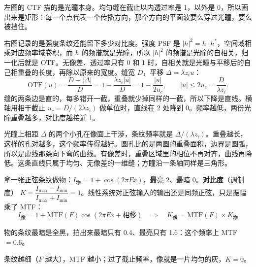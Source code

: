 左图的 CTF 描的是光瞳本身。均匀缝在截止以内透过率是 1，以外是 0，所以画出来是矩形：每一个点代表一个传播方向，那个方向的平面波要么穿过光瞳，要么被挡住。

右图记录的是强度条纹还能留下多少对比度。强度 PSF 是 $|h|^2=h\cdot h^*$，空间域相乘对应频率域卷积，而 $h$ 的频谱就是光瞳，所以 $|h|^2$ 的频谱是光瞳的自相关，归一化后就是 OTF。无像差、透过率只有 0 和 1 时，自相关就是光瞳与平移后的自己相重叠的长度，再除以原来的宽度。缝宽 $D$，平移 $\Delta=\lambda z_i u$：
\[
\mathrm{OTF}(u)=\frac{D-|\Delta|}{D}=1-\frac{\lambda z_i|u|}{D}=1-\frac{|u|}{2u_c},
\qquad |u|\le 2u_c=\frac{D}{\lambda z_i}.
\]
缝的两条边是直的，每多错开一截，重叠就少掉同样的一截，所以下降是直线。横轴用相干截止 $u_c=D/(2\lambda z_i)$ 做单位时，直线在 $2$ 处降到 0。频率越低，两份光瞳重叠越多，对比度越接近 1。

光瞳上相距 $\Delta$ 的两个小孔在像面上干涉，条纹频率就是 $\Delta/(\lambda z_i)$。重叠越长，这样的孔对越多，这个频率传得越好。圆孔比的是两圆的重叠面积，边界是圆弧，所以是虚线那条向下弯的曲线。有像差时，重叠区域里的相位不再对齐，曲线再降低。这条直线只属于均匀、无像差的一维缝；方瞳沿一条轴同样是三角形。

拿一张正弦条纹做物：$I_{\text{物}}=1+\cos(2\pi Fx)$，最亮 2、最暗 0。\textbf{对比度}（调制度）
$K=\dfrac{I_{\max}-I_{\min}}{I_{\max}+I_{\min}}=1$。线性系统对正弦输入的输出还是同频正弦，只是振幅乘了 MTF：
\[
I_{\text{像}}=1+\mathrm{MTF}(F)\cos(2\pi Fx+\text{相移})\quad\Rightarrow\quad K_{\text{像}}=\mathrm{MTF}(F)\times K_{\text{物}}
\]

\begin{center}

{\small 物的条纹最暗是全黑，拍出来最暗只有 0.4、最亮只有 1.6：这个频率上 MTF $=0.6$。}
\end{center}
条纹越细（$F$ 越大），MTF 越小；过了截止频率，像就是一片均匀的灰，$K=0$。

